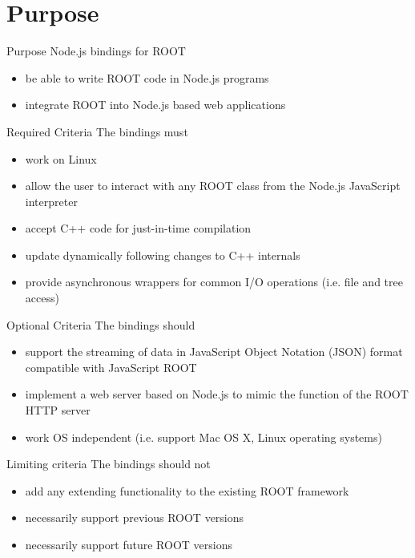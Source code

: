 \section{Purpose}
\begin{frame}{Purpose}
	Node.js bindings for ROOT
	 \begin{itemize}
	 	\item be able to write ROOT code in Node.js programs
	 	\item integrate ROOT into Node.js based web applications
	 \end{itemize}
\end{frame}

\begin{frame}{Required Criteria}
	The bindings must
	 \begin{itemize}
	 	\item work on Linux
	 	\item allow the user to interact with any ROOT class from the Node.js JavaScript interpreter
	 	\item accept C++ code for just-in-time compilation
	 	\item update dynamically following changes to C++ internals
	 	\item provide asynchronous wrappers for common I/O operations (i.e. file and tree access)
	 \end{itemize}
\end{frame}

\begin{frame}{Optional Criteria}
	The bindings should
	\begin{itemize}
		\item support the streaming of data in JavaScript Object Notation (JSON) format compatible with JavaScript ROOT
		\item implement a web server based on Node.js to mimic the function of the ROOT HTTP server
		\item work OS independent (i.e. support Mac OS X, Linux operating systems)
	\end{itemize}
\end{frame}

\begin{frame}{Limiting criteria} 
	The bindings should not
	\begin{itemize}
		\item add any extending functionality to the existing ROOT framework
		\item necessarily support previous ROOT versions
		\item necessarily support future ROOT versions
	\end{itemize}
\end{frame}